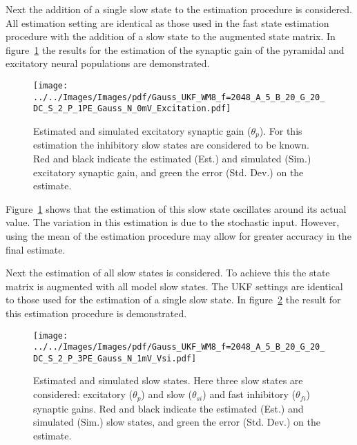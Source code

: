 Next the addition of a single slow state to the estimation procedure is considered. All estimation setting are identical as those used in the fast state estimation procedure with the addition of a slow state to the augmented state matrix. In figure~\ref{fig: ESTOSFP} the results for the estimation of the synaptic gain of the pyramidal and excitatory neural populations are demonstrated. 

\begin{figure}
	\centering
		\texttt{[image: ../../Images/Images/pdf/Gauss\_UKF\_WM8\_f=2048\_A\_5\_B\_20\_G\_20\_DC\_S\_2\_P\_1PE\_Gauss\_N\_0mV\_Excitation.pdf]}
	\caption{Estimated and simulated excitatory synaptic gain ($\theta_{p}$). For this estimation the inhibitory slow states are considered to be known. Red and black indicate the estimated (Est.) and simulated (Sim.) excitatory synaptic gain, and green the error (Std. Dev.) on the estimate.}
	\label{fig: ESTOSFP}
\end{figure}

Figure~\ref{fig: ESTOSFP} shows that the estimation of this slow state oscillates around its actual value. The variation in this estimation is due to the stochastic input. However, using the mean of the estimation procedure may allow for greater accuracy in the final estimate.


Next the estimation of all slow states is considered. To achieve this the state matrix is augmented with all model slow states. The UKF settings are identical to those used for the estimation of a single slow state. In figure~\ref{fig: ESTMP3} the result for this estimation procedure is demonstrated.
\begin{figure}%
	\centering
		\texttt{[image: ../../Images/Images/pdf/Gauss\_UKF\_WM8\_f=2048\_A\_5\_B\_20\_G\_20\_DC\_S\_2\_P\_3PE\_Gauss\_N\_1mV\_Vsi.pdf]}
	\caption{Estimated and simulated slow states. Here three slow states are considered: excitatory ($\theta_{p}$) and slow ($\theta_{si}$) and fast inhibitory ($\theta_{fi}$) synaptic gains. Red and black indicate the estimated (Est.) and simulated (Sim.) slow states, and green the error (Std. Dev.) on the estimate.}
	\label{fig: ESTMP3}
\end{figure}%


